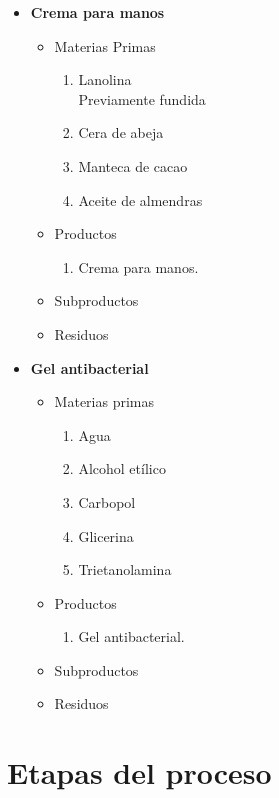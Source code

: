 \documentclass[12pt]{article}
\begin{document}
	\begin{itemize}
		\item \textbf{Crema para manos}
		\begin{itemize}
			\item Materias Primas
			\begin{enumerate}
				\item Lanolina\\
					Previamente fundida
				\item Cera de abeja
				\item Manteca de cacao
				\item Aceite de almendras
			\end{enumerate}
			\item Productos
				\begin{enumerate}
					\item Crema para manos.		
				\end{enumerate}
			\item Subproductos
			\item Residuos
		\end{itemize}


		\item \textbf{Gel antibacterial}
		\begin{itemize}
			\item Materias primas
			\begin{enumerate}
				\item Agua
				\item Alcohol etílico
				\item Carbopol
				\item Glicerina
				\item Trietanolamina
			\end{enumerate}
			\item Productos\\
				\begin{enumerate}
					\item Gel antibacterial.
				\end{enumerate}
			\item Subproductos
			\item Residuos
		\end{itemize}
	\end{itemize}

\section{Etapas del proceso}
\end{document}
